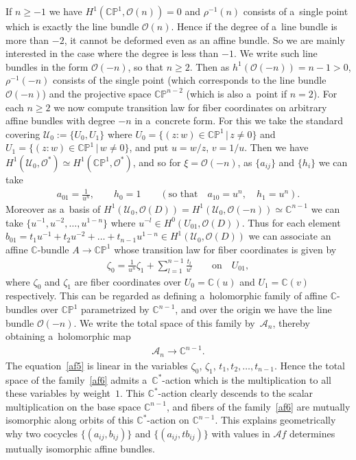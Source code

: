 If $n\ge -1$ we have $H^1(\mathbb{CP}^1,\mathscr O(n))=0$ and $\rho^{-1}(n)$ consists of a~single point which is exactly
the line bundle $\mathscr O(n)$.
Hence if the degree of a~line bundle is more than $-2$, it cannot be deformed even as an af\/f\/ine bundle.
So we are mainly interested in the case where the degree is less than $-1$.
We write such line bundles in the form $\mathscr O(-n)$, so that $n\ge 2$.
Then as $h^1(\mathscr O(-n)) = n-1>0$, $\rho^{-1}(-n)$ consists of the single point (which corresponds to the line
bundle $\mathscr O(-n)$) and the projective space $\mathbb{CP}^{n-2}$ (which is also a~point if $n=2$).
For each $n\ge 2$ we now compute transition law for f\/iber coordinates on arbitrary af\/f\/ine bundles with degree $-n$
in a~concrete form.
For this we take the standard covering $\mathscr U_0:=\{U_0,U_1\}$ where $U_0 =\{(z:w)\in\mathbb{CP}^1\,|\, z\neq 0\}$
and $U_1 =\{(z:w)\in\mathbb{CP}^1\,|\, w\neq 0\}$, and put $u = w/z$, $v=1/u$.
Then we have $H^1(\mathscr U_0,\mathscr O^*)\simeq H^1(\mathbb{CP}^1, \mathscr O^*)$, and so for $\xi=\mathscr O(-n)$,
as $\{a_{ij}\}$ and $\{h_i\}$ we can take
\begin{gather*}
a_{01} = \frac 1{u^n},
\qquad
h_0 =1
\qquad
(\text{so that}
\quad
a_{10} = u^n,
\quad
h_1 = {u^n}).
\end{gather*}
Moreover as a~basis of $H^1(\mathscr U_0,\mathscr O(D)) \!=\!H^1(\mathscr U_0,\mathscr O(-n))\!\simeq\! \mathbb{C}^{n-1}$ we can
take $\{u^{-1},u^{-2},\dots,u^{1-n}\}$ where $u^{-l}\in H^0(U_{01},\mathscr O(D))$.
Thus for each element $b_{01}=t_1u^{-1}+t_2u^{-2} + \dots + t_{n-1} u^{1-n}\in H^1(\mathscr U_0,\mathscr O(D))$ we can
associate an af\/f\/ine $\mathbb{C}$-bundle $A\to\mathbb{CP}^1$ whose transition law for f\/iber coordinates is given by
\begin{gather}
\label{af5}
\zeta_0 = \frac 1{u^n} \zeta_1 + \sum\limits_{l=1}^{n-1} \frac {t_l} {u^l}
\qquad
\text{on}
\quad
U_{01},
\end{gather}
where $\zeta_0$ and $\zeta_1$ are f\/iber coordinates over $U_0=\mathbb{C}(u)$ and $U_1=\mathbb{C}(v)$ respectively.
This can be regarded as def\/ining a~holomorphic family of af\/f\/ine $\mathbb{C}$-bundles over $\mathbb{CP}^1$
parametrized by $\mathbb{C}^{n-1}$, and over the origin we have the line bundle $\mathscr O(-n)$.
We write the total space of this family by~$\mathscr A_n$, thereby obtaining a~holomorphic map
\begin{gather}
\label{af6}
\mathscr A_n\to\mathbb{C}^{n-1}.
\end{gather}
The equation~\eqref{af5} is linear in the variables $\zeta_0$, $\zeta_1$, $t_1,t_2,\dots,t_{n-1}$.
Hence the total space of the family~\eqref{af6} admits a~$\mathbb{C}^*$-action which is the multiplication to all these
variables by weight~$1$.
This $\mathbb{C}^*$-action clearly descends to the scalar multiplication on the base space $\mathbb{C}^{n-1}$, and
f\/ibers of the family~\eqref{af6} are mutually isomorphic along orbits of this $\mathbb{C}^*$-action on
$\mathbb{C}^{n-1}$.
This explains geometrically why two cocycles $\{(a_{ij},b_{ij})\}$ and $\{(a_{ij},tb_{ij})\}$ with values in $\mathscr
Af$ determines mutually isomorphic af\/f\/ine bundles.

